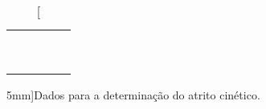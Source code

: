 \begin{table*}[!ht]
\begin{tabular}{lp{25mm}p{25mm}p{25mm}l}
	& \cellcolor[gray]{0.95} & \cellcolor[gray]{0.97}  \\ 
	& \cellcolor[gray]{0.89} & \cellcolor[gray]{0.92}  \\ 
	& \cellcolor[gray]{0.95} & \cellcolor[gray]{0.97}  \\ 
	& \cellcolor[gray]{0.89} & \cellcolor[gray]{0.92}  \\ 
	& \cellcolor[gray]{0.95} & \cellcolor[gray]{0.97}  \\ 
	& \cellcolor[gray]{0.89} & \cellcolor[gray]{0.92}  \\ 
	& \cellcolor[gray]{0.95} & \cellcolor[gray]{0.97}  \\ 
	& \cellcolor[gray]{0.89} & \cellcolor[gray]{0.92}  \\ 
	& \cellcolor[gray]{0.95} & \cellcolor[gray]{0.97}  \\ 
	\cmidrule{2-3}
\bottomrule
\end{tabular}
\caption[][5mm]{Dados para a determinação do atrito cinético.}
\label{DadosAtritoCinetico}
\end{table*}

